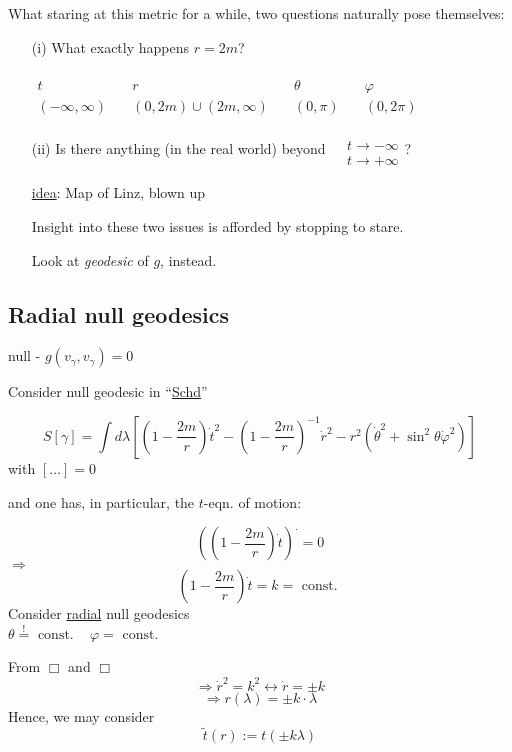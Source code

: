 \documentclass[10pt, twoside]{amsart}
\begin{document}
\begin{multicols*}{2}
What staring at this metric for a while, two questions naturally pose themselves:

\begin{enumerate}
\item[(i)] What exactly happens \@ $r= 2m$?

$\begin{aligned} & & & & \quad \\
 t \quad & r \quad & \theta \quad & \varphi \\ 
 (-\infty,\infty) \quad & (0,2m) \cup ( 2m, \infty) \quad & (0,\pi) \quad & (0,2\pi) \end{aligned}$


\item[(ii)] Is there anything (in the real world) beyond $\begin{aligned} & \quad \\
  & t \to -\infty \\
  & t\to +\infty \end{aligned}$?

\underline{idea}: Map of Linz, blown up

Insight into these two issues is afforded by stopping to stare.  

Look at \emph{geodesic} of $g$, instead.

\end{enumerate}

\subsection{Radial null geodesics}

null - $g(v_{\gamma},v_{\gamma} ) = 0$

Consider null geodesic in ``\underline{Schd}''

\[
S[\gamma ] = \int d\lambda \left[ \left( 1 - \frac{2m}{r} \right)\dot{t}^2 - \left(1 - \frac{2m}{r} \right)^{-1} \dot{r}^2 - r^2( \dot{\theta}^2 + \sin^2{\theta} \dot{\varphi}^2 ) \right]
\]
with $[\dots ] =0$

and one has, in particular, the $t$-eqn. of motion:

\[
\left( \left( 1-  \frac{2m}{r} \right) \dot{t} \right)^{.} = 0
\]
$\Longrightarrow$
\[
\boxed{ \left( 1 - \frac{2m}{r} \right)\dot{t} = k } = \text{ const. }
\]
Consider \underline{radial} null geodesics \\
$\theta \overset{!}{=} \text{ const. }$ \quad \quad \, $\varphi = \text{ const. }$

From $\Box $ and $\Box $
\[
\Longrightarrow \dot{r}^2 = k^2 \leftrightarrow \dot{r} = \pm k
\]
\[
\Longrightarrow r(\lambda) = \pm k \cdot \lambda
\]
Hence, we may consider 
\[
\widetilde{t}(r) := t(\pm k\lambda)
\]


\end{multicols*}
\end{document}
